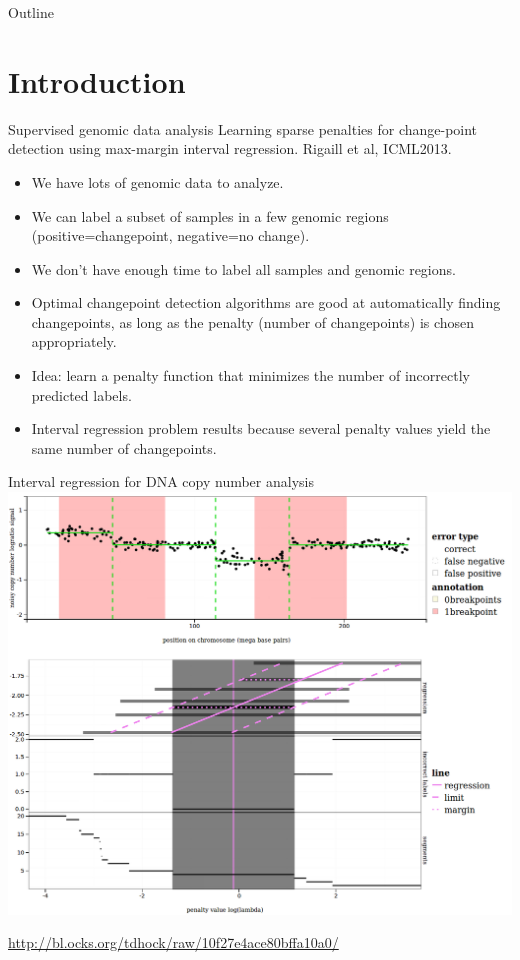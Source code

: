 \documentclass{beamer}
\begin{document}
\begin{frame}{Outline}
\tableofcontents
\end{frame}

\section{Introduction}

\begin{frame}{Supervised genomic data analysis}
  Learning sparse penalties for change-point detection using
  max-margin interval regression. Rigaill et al, ICML2013.
  \begin{itemize}
  \item We have lots of genomic data to analyze.
  \item We can label a subset of samples in a few genomic regions
    (positive=changepoint, negative=no change).
  \item We don't have enough time to label all samples and genomic regions.
  \item Optimal changepoint detection algorithms are good at
    automatically finding changepoints, as long as the penalty (number
    of changepoints) is chosen appropriately.
  \item Idea: learn a penalty function that minimizes the number of
    incorrectly predicted labels.
  \item Interval regression problem results because several penalty
    values yield the same number of changepoints.
  \end{itemize}
\end{frame}

\begin{frame}{Interval regression for DNA copy number analysis}
  \includegraphics[height=0.8\textheight]{DNA-copy-number-analysis}

  \url{http://bl.ocks.org/tdhock/raw/10f27e4ace80bffa10a0/}
\end{frame}
\end{document}
